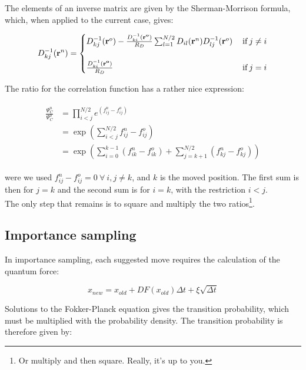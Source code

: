 \documentclass[english, a4paper]{article}
\newcommand{\bm}[1]{\mathbf{#1}}
\begin{document}
The elements of an inverse matrix are given by the Sherman-Morrison formula, which, when applied to the current case, gives:

\begin{equation}
D_{kj}^{-1}(\bm{r}^n) =
\begin{cases}
D_{kj}^{-1}(\bm{r}^o) - \frac{D_{ki}^{-1}(\bm{r^o})}{R_D}\sum_{l=1}^{N/2}D_{il}(\bm{r}^n)D_{lj}^{-1}(\bm{r}^o) \:&\text{if}\: j\neq i\\ \vspace{1pt}\\
\frac{D_{ki}^{-1}(\bm{r^o})}{R_D} \:&\text{if}\: j = i \\
\end{cases}
\label{eq:update_inverse_SD}
\end{equation}

The ratio for the correlation function has a rather nice expression:

\begin{align}
	\begin{split}
	\frac{\Psi_C^n}{\Psi_C^o} &= \prod_{i<j}^{N/2} e^{(f_{ij}^n-f_{ij}^o)}\\
	&= \exp\left( \sum_{i<j}^{N/2} f_{ij}^n - f_{ij}^o \right)\\
	&= \exp\left(\sum_{i=0}^{k-1}(f_{ik}^n - f_{ik}^o) + \sum_{j=k+1}^{N/2}(f_{kj}^n - f_{kj}^o)\right)
	\end{split}
\end{align}

were we used $f_{ij}^n-f_{ij}^o=0\:\forall\:i,j\neq k$, and $k$ is the moved position. The first sum is then for $j=k$ and the second sum is for $i=k$, with the restriction $i<j$.\\
The only step that remains is to square and multiply the two ratios\footnote{Or multiply and then square. Really, it's up to you.}.

\subsection{Importance sampling}
In importance sampling, each suggested move requires the calculation of the quantum force:

\begin{equation}
	x_{new} = x_{old} + DF(x_{old})\Delta t + \xi\sqrt{\Delta t}
\end{equation}

Solutions to the Fokker-Planck equation gives the transition probability, which must be multiplied with the probability density. The transition probability is therefore given by:
\end{document}
